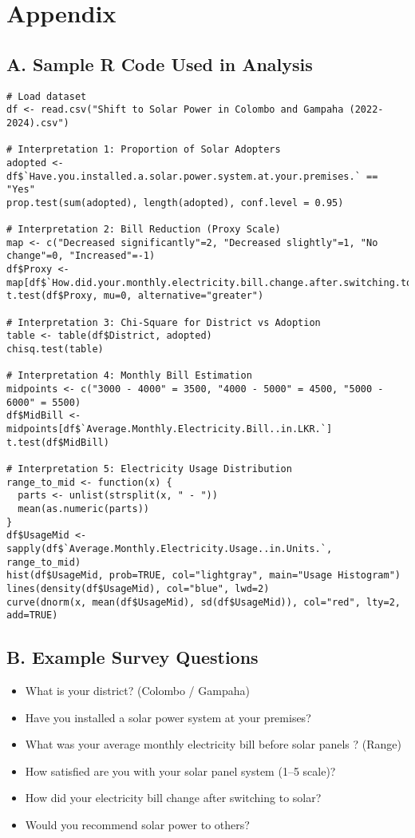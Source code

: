 \documentclass[12pt,a4paper]{article}
\begin{document}
\clearpage
\appendix
\section*{Appendix}

\subsection*{A. Sample R Code Used in Analysis}

\begin{verbatim}
# Load dataset
df <- read.csv("Shift to Solar Power in Colombo and Gampaha (2022-2024).csv")

# Interpretation 1: Proportion of Solar Adopters
adopted <- df$`Have.you.installed.a.solar.power.system.at.your.premises.` == "Yes"
prop.test(sum(adopted), length(adopted), conf.level = 0.95)

# Interpretation 2: Bill Reduction (Proxy Scale)
map <- c("Decreased significantly"=2, "Decreased slightly"=1, "No change"=0, "Increased"=-1)
df$Proxy <- map[df$`How.did.your.monthly.electricity.bill.change.after.switching.to.solar.`]
t.test(df$Proxy, mu=0, alternative="greater")

# Interpretation 3: Chi-Square for District vs Adoption
table <- table(df$District, adopted)
chisq.test(table)

# Interpretation 4: Monthly Bill Estimation
midpoints <- c("3000 - 4000" = 3500, "4000 - 5000" = 4500, "5000 - 6000" = 5500)
df$MidBill <- midpoints[df$`Average.Monthly.Electricity.Bill..in.LKR.`]
t.test(df$MidBill)

# Interpretation 5: Electricity Usage Distribution
range_to_mid <- function(x) {
  parts <- unlist(strsplit(x, " - "))
  mean(as.numeric(parts))
}
df$UsageMid <- sapply(df$`Average.Monthly.Electricity.Usage..in.Units.`, range_to_mid)
hist(df$UsageMid, prob=TRUE, col="lightgray", main="Usage Histogram")
lines(density(df$UsageMid), col="blue", lwd=2)
curve(dnorm(x, mean(df$UsageMid), sd(df$UsageMid)), col="red", lty=2, add=TRUE)
\end{verbatim}

\subsection*{B. Example Survey Questions}

\begin{itemize}
  \item What is your district? (Colombo / Gampaha)
  \item Have you installed a solar power system at your premises?
  \item What was your average monthly electricity bill before solar panels ? (Range)
  \item How satisfied are you with your solar panel system (1–5 scale)?
  \item How did your electricity bill change after switching to solar?
  \item Would you recommend solar power to others?
\end{itemize}
\end{document}
